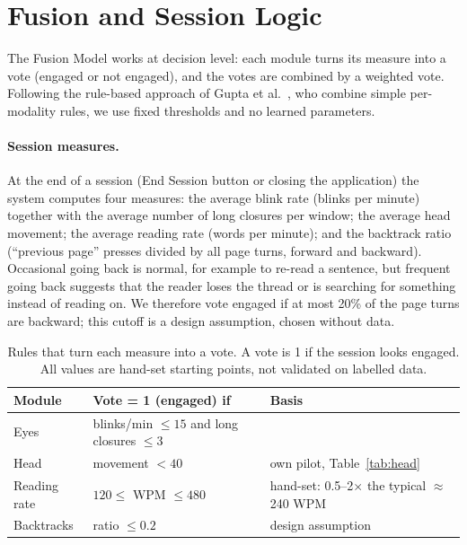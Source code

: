 \documentclass[sigconf,nonacm]{acmart}
\begin{document}
\section{Fusion and Session Logic}\label{sec:fusion}
The Fusion Model works at decision level: each module turns its measure into a vote (engaged or not engaged), and the
votes are combined by a weighted vote. Following the rule-based approach of Gupta et al.~\cite{gupta2023multimodal},
who combine simple per-modality rules, we use fixed thresholds and no learned parameters.

\paragraph{Session measures.}
At the end of a session (End Session button or closing the application) the system computes four measures:
the average blink rate (blinks per minute) together with the average number of long closures per window;
the average head movement; the average reading rate (words per minute); and the backtrack ratio (``previous page'' presses divided by
all page turns, forward and backward). Occasional going back is normal, for example to re-read a sentence, but frequent going back suggests that the reader loses the thread or is searching for something instead of reading on. We therefore vote engaged if at most 20\% of the page turns are backward; this cutoff is a design assumption, chosen without data.

\begin{table}[t]
  \caption{Rules that turn each measure into a vote. A vote is 1 if the session looks engaged. All values are hand-set
  starting points, not validated on labelled data.}
  \label{tab:thresholds}
  \begin{tabular}{lll}
    \toprule
    Module & Vote = 1 (engaged) if & Basis \\
    \midrule
    Eyes & blinks/min $\le 15$ and long closures $\le 3$ & \cite{gupta2023multimodal} \\
    Head & movement $< 40$ & own pilot, Table~\ref{tab:head} \\
    Reading rate & $120 \le$ WPM $\le 480$ & hand-set: 0.5--2$\times$ the typical $\approx$240 WPM \\
    Backtracks & ratio $\le 0.2$ & design assumption \\
    \bottomrule
  \end{tabular}
\end{table}
\end{document}
